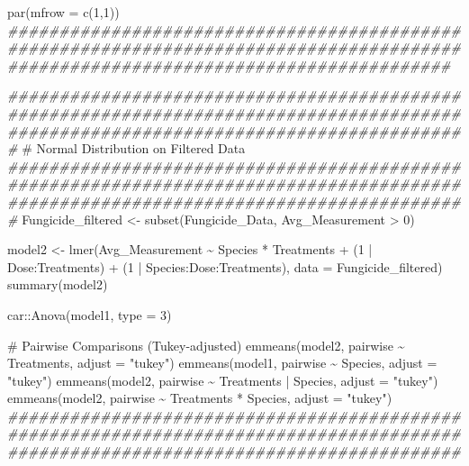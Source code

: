 \documentclass[
  10pt,
  letterpaper,
  twocolumn]{article}
\newenvironment{Shaded}{\begin{snugshade}}{\end{snugshade}}
\newcommand{\AttributeTok}[1]{\textcolor[rgb]{0.40,0.45,0.13}{#1}}
\newcommand{\CommentTok}[1]{\textcolor[rgb]{0.37,0.37,0.37}{#1}}
\newcommand{\DecValTok}[1]{\textcolor[rgb]{0.68,0.00,0.00}{#1}}
\newcommand{\DocumentationTok}[1]{\textcolor[rgb]{0.37,0.37,0.37}{\textit{#1}}}
\newcommand{\FunctionTok}[1]{\textcolor[rgb]{0.28,0.35,0.67}{#1}}
\newcommand{\NormalTok}[1]{\textcolor[rgb]{0.00,0.23,0.31}{#1}}
\newcommand{\OtherTok}[1]{\textcolor[rgb]{0.00,0.23,0.31}{#1}}
\newcommand{\SpecialCharTok}[1]{\textcolor[rgb]{0.37,0.37,0.37}{#1}}
\newcommand{\StringTok}[1]{\textcolor[rgb]{0.13,0.47,0.30}{#1}}
\begin{document}
\begin{Shaded}
\begin{Highlighting}[]
\FunctionTok{par}\NormalTok{(}\AttributeTok{mfrow =} \FunctionTok{c}\NormalTok{(}\DecValTok{1}\NormalTok{,}\DecValTok{1}\NormalTok{))}
\DocumentationTok{\#\#\#\#\#\#\#\#\#\#\#\#\#\#\#\#\#\#\#\#\#\#\#\#\#\#\#\#\#\#\#\#\#\#\#\#\#\#\#\#\#\#\#\#\#\#\#\#\#\#\#\#\#\#\#\#\#\#\#\#\#\#\#\#\#\#\#\#\#\#\#\#\#\#\#\#\#\#\#\#\#\#\#\#\#\#\#\#\#\#\#\#\#\#\#\#\#\#\#\#\#\#\#\#\#\#\#\#\#\#\#\#\#\#\#\#\#\#\#\#\#\#\#\#\#\#\#\#\#\#\#}

\DocumentationTok{\#\#\#\#\#\#\#\#\#\#\#\#\#\#\#\#\#\#\#\#\#\#\#\#\#\#\#\#\#\#\#\#\#\#\#\#\#\#\#\#\#\#\#\#\#\#\#\#\#\#\#\#\#\#\#\#\#\#\#\#\#\#\#\#\#\#\#\#\#\#\#\#\#\#\#\#\#\#\#\#\#\#\#\#\#\#\#\#\#\#\#\#\#\#\#\#\#\#\#\#\#\#\#\#\#\#\#\#\#\#\#\#\#\#\#\#\#\#\#\#\#\#\#\#\#\#\#\#\#\#\#\#\#}
\CommentTok{\# Normal Distribution on Filtered Data}
\DocumentationTok{\#\#\#\#\#\#\#\#\#\#\#\#\#\#\#\#\#\#\#\#\#\#\#\#\#\#\#\#\#\#\#\#\#\#\#\#\#\#\#\#\#\#\#\#\#\#\#\#\#\#\#\#\#\#\#\#\#\#\#\#\#\#\#\#\#\#\#\#\#\#\#\#\#\#\#\#\#\#\#\#\#\#\#\#\#\#\#\#\#\#\#\#\#\#\#\#\#\#\#\#\#\#\#\#\#\#\#\#\#\#\#\#\#\#\#\#\#\#\#\#\#\#\#\#\#\#\#\#\#\#\#\#\#}
\NormalTok{Fungicide\_filtered }\OtherTok{\textless{}{-}} \FunctionTok{subset}\NormalTok{(Fungicide\_Data, Avg\_Measurement }\SpecialCharTok{\textgreater{}} \DecValTok{0}\NormalTok{)}

\NormalTok{model2 }\OtherTok{\textless{}{-}} \FunctionTok{lmer}\NormalTok{(Avg\_Measurement }\SpecialCharTok{\textasciitilde{}}\NormalTok{ Species }\SpecialCharTok{*}\NormalTok{ Treatments }\SpecialCharTok{+} 
\NormalTok{                 (}\DecValTok{1} \SpecialCharTok{|}\NormalTok{ Dose}\SpecialCharTok{:}\NormalTok{Treatments) }\SpecialCharTok{+}\NormalTok{ (}\DecValTok{1} \SpecialCharTok{|}\NormalTok{ Species}\SpecialCharTok{:}\NormalTok{Dose}\SpecialCharTok{:}\NormalTok{Treatments), }
               \AttributeTok{data =}\NormalTok{ Fungicide\_filtered)}
\FunctionTok{summary}\NormalTok{(model2)}

\NormalTok{car}\SpecialCharTok{::}\FunctionTok{Anova}\NormalTok{(model1, }\AttributeTok{type =} \DecValTok{3}\NormalTok{)}

\CommentTok{\# Pairwise Comparisons (Tukey{-}adjusted)}
\FunctionTok{emmeans}\NormalTok{(model2, pairwise }\SpecialCharTok{\textasciitilde{}}\NormalTok{ Treatments, }\AttributeTok{adjust =} \StringTok{"tukey"}\NormalTok{)}
\FunctionTok{emmeans}\NormalTok{(model1, pairwise }\SpecialCharTok{\textasciitilde{}}\NormalTok{ Species, }\AttributeTok{adjust =} \StringTok{"tukey"}\NormalTok{)}
\FunctionTok{emmeans}\NormalTok{(model2, pairwise }\SpecialCharTok{\textasciitilde{}}\NormalTok{ Treatments }\SpecialCharTok{|}\NormalTok{ Species, }\AttributeTok{adjust =} \StringTok{"tukey"}\NormalTok{)}
\FunctionTok{emmeans}\NormalTok{(model2, pairwise }\SpecialCharTok{\textasciitilde{}}\NormalTok{ Treatments }\SpecialCharTok{*}\NormalTok{ Species, }\AttributeTok{adjust =} \StringTok{"tukey"}\NormalTok{)}
\DocumentationTok{\#\#\#\#\#\#\#\#\#\#\#\#\#\#\#\#\#\#\#\#\#\#\#\#\#\#\#\#\#\#\#\#\#\#\#\#\#\#\#\#\#\#\#\#\#\#\#\#\#\#\#\#\#\#\#\#\#\#\#\#\#\#\#\#\#\#\#\#\#\#\#\#\#\#\#\#\#\#\#\#\#\#\#\#\#\#\#\#\#\#\#\#\#\#\#\#\#\#\#\#\#\#\#\#\#\#\#\#\#\#\#\#\#\#\#\#\#\#\#\#\#\#\#\#\#\#\#\#\#\#\#\#}


\end{Highlighting}
\end{Shaded}
\end{document}
